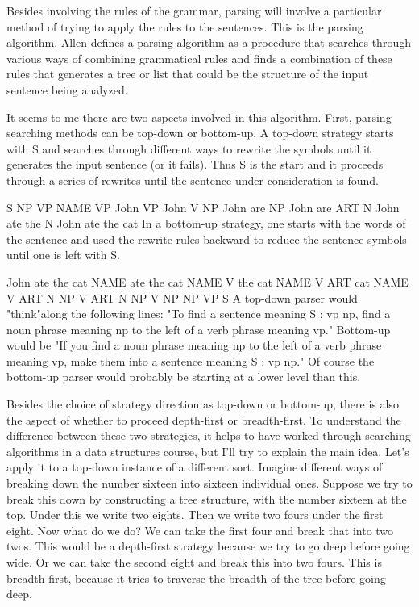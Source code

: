 Besides involving the rules of the grammar, parsing will involve a particular method of trying to apply the rules to the sentences. This is the parsing algorithm. Allen defines a parsing algorithm as a procedure that searches through various ways of combining grammatical rules and finds a combination of these rules that generates a tree or list that could be the structure of the input sentence being analyzed.

It seems to me there are two aspects involved in this algorithm. First, parsing searching methods can be top-down or bottom-up. A top-down strategy starts with S and searches through different ways to rewrite the symbols until it generates the input sentence (or it fails). Thus S is the start and it proceeds through a series of rewrites until the sentence under consideration is found.

S
NP VP
NAME VP
John VP
John V NP
John are NP
John are ART N
John ate the N
John ate the cat
In a bottom-up strategy, one starts with the words of the sentence and used the rewrite rules backward to reduce the sentence symbols until one is left with S.

John ate the cat
NAME ate the cat
NAME V the cat
NAME V ART cat
NAME V ART N
NP V ART N
NP V NP
NP VP
S 
A top-down parser would "think"along the following lines: "To find a sentence meaning S : vp np, find a noun phrase meaning np to the left of a verb phrase meaning vp." Bottom-up would be "If you find a noun phrase meaning np to the left of a verb phrase meaning vp, make them into a sentence meaning S : vp np." Of course the bottom-up parser would probably be starting at a lower level than this.

Besides the choice of strategy direction as top-down or bottom-up, there is also the aspect of whether to proceed depth-first or breadth-first. To understand the difference between these two strategies, it helps to have worked through searching algorithms in a data structures course, but I'll try to explain the main idea. Let's apply it to a top-down instance of a different sort. Imagine different ways of breaking down the number sixteen into sixteen individual ones. Suppose we try to break this down by constructing a tree structure, with the number sixteen at the top. Under this we write two eights. Then we write two fours under the first eight. Now what do we do? We can take the first four and break that into two twos. This would be a depth-first strategy because we try to go deep before going wide. Or we can take the second eight and break this into two fours. This is breadth-first, because it tries to traverse the breadth of the tree before going deep.

